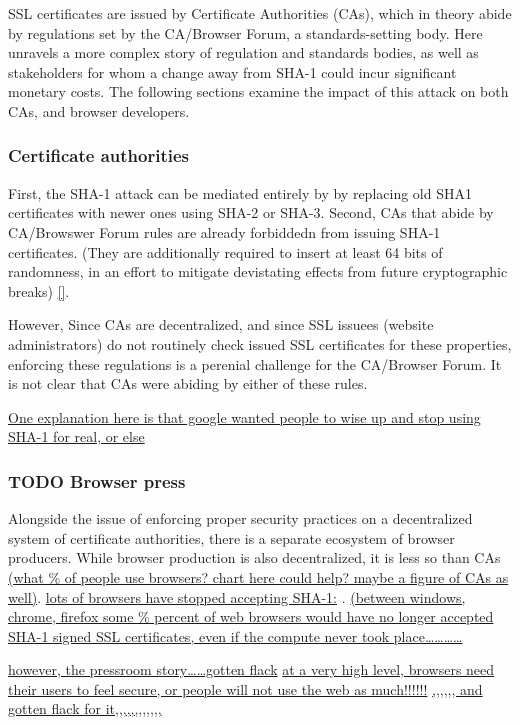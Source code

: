 \documentclass[sigconf]{acmart}
\begin{document}
SSL certificates are issued by Certificate Authorities (CAs), which in theory abide by 
regulations set by the CA/Browser Forum, a standards-setting body.
Here unravels a more complex story of regulation and standards bodies,
as well as stakeholders for whom a change away from SHA-1 could incur significant monetary costs.
The following sections examine the impact of this attack on both CAs, and browser developers. 

\subsubsection{Certificate authorities}
\label{sec:org5717f3a}

First, the SHA-1 attack can be mediated entirely by
by replacing old SHA1 certificates with newer ones using SHA-2 or SHA-3.
Second, CAs that abide by CA/Browswer Forum rules are already forbiddedn from issuing SHA-1 certificates. (They are additionally required to insert at least 64 bits of randomness, in an effort to mitigate devistating effects from future cryptographic breaks) \uline{[]}.

However, Since CAs are decentralized, and since SSL issuees (website administrators) do not routinely check issued SSL certificates for these properties, enforcing these regulations is a perenial challenge for the CA/Browser Forum. It is not clear that CAs were abiding by either of these rules.

\uline{One explanation here is that google wanted people to wise up and stop using SHA-1 for real, or else}

\subsubsection{{\bfseries\sffamily TODO} Browser press}
\label{sec:orgeda3b3c}

Alongside the issue of enforcing proper security practices on a decentralized system of certificate authorities, 
there is a separate ecosystem of browser producers.
While browser production is also decentralized, it is less so than CAs
\uline{(what \% of people use browsers? chart here could help? maybe a figure of CAs as well)}.
\uline{lots of browsers have stopped accepting SHA-1:}
\cite{Sleevi2014,Mozilla2017}.
\uline{(between windows, chrome, firefox some \% percent of web browsers would have no longer accepted SHA-1 signed SSL certificates, even if the compute never took place\ldots{}\ldots{}\ldots{}\ldots{}}

\uline{however, the pressroom story\ldots{}\ldots{}gotten flack}
\uline{at a very high level, browsers need their users to feel secure, or people will not use the web as much!!!!!!}
\uline{,,,,,, and gotten flack for it,,,,,,,,,,,,}
\end{document}
